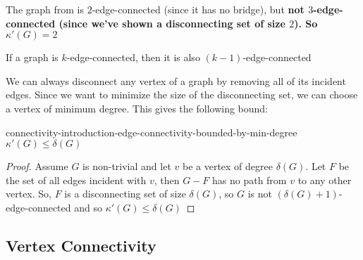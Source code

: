\begin{example}
    The graph from  is $2$-edge-connected (since it has no bridge), but \bf{not} $3$-edge-connected (since we've shown a disconnecting set of size $2$).
    So $\kappa'(G) = 2$
\end{example}

\begin{example}
    If a graph is $k$-edge-connected, then it is also $(k-1)$-edge-connected
\end{example}

We can always disconnect any vertex of a graph by removing all of its incident edges.
Since we want to minimize the size of the disconnecting set, we can choose a vertex of minimum degree.
This gives the following bound:
\begin{proposition}
    {}
    {connectivity-introduction-edge-connectivity-bounded-by-min-degree}
    $\kappa'(G) \leq \delta(G)$
\end{proposition}
\begin{proof}
    Assume $G$ is non-trivial and let $v$ be a vertex of degree $\delta(G)$.
    Let $F$ be the set of all edges incident with $v$, then $G - F$ has no path from $v$ to any other vertex.
    So, $F$ is a disconnecting set of size $\delta(G)$, so $G$ is not $(\delta(G) + 1)$-edge-connected and so $\kappa'(G) \leq \delta(G)$
\end{proof}



\subsection{Vertex Connectivity}